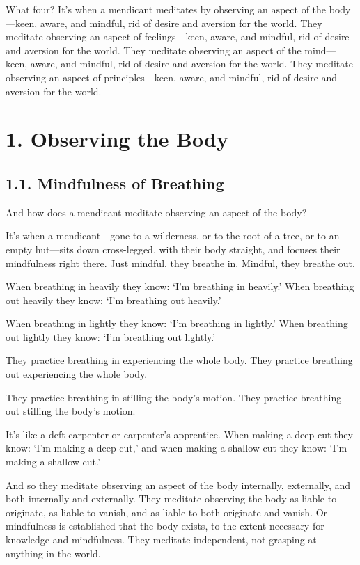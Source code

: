 \documentclass[12pt,openany]{book}%
\begin{document}
What four? It’s when a mendicant meditates by observing an aspect of the body—keen, aware, and mindful, rid of desire and aversion for the world. They meditate observing an aspect of feelings—keen, aware, and mindful, rid of desire and aversion for the world. They meditate observing an aspect of the mind—keen, aware, and mindful, rid of desire and aversion for the world. They meditate observing an aspect of principles—keen, aware, and mindful, rid of desire and aversion for the world. 

\section*{1. Observing the Body }

\subsection*{1.1. Mindfulness of Breathing }

And how does a mendicant meditate observing an aspect of the body? 

It’s when a mendicant—gone to a wilderness, or to the root of a tree, or to an empty hut—sits down cross-legged, with their body straight, and focuses their mindfulness right there. Just mindful, they breathe in. Mindful, they breathe out. 

When breathing in heavily they know: ‘I’m breathing in heavily.’ When breathing out heavily they know: ‘I’m breathing out heavily.’ 

When breathing in lightly they know: ‘I’m breathing in lightly.’ When breathing out lightly they know: ‘I’m breathing out lightly.’ 

They practice breathing in experiencing the whole body. They practice breathing out experiencing the whole body. 

They practice breathing in stilling the body’s motion. They practice breathing out stilling the body’s motion. 

It’s like a deft carpenter or carpenter’s apprentice. When making a deep cut they know: ‘I’m making a deep cut,’ and when making a shallow cut they know: ‘I’m making a shallow cut.’ 

And so they meditate observing an aspect of the body internally, externally, and both internally and externally. They meditate observing the body as liable to originate, as liable to vanish, and as liable to both originate and vanish. Or mindfulness is established that the body exists, to the extent necessary for knowledge and mindfulness. They meditate independent, not grasping at anything in the world. 
\end{document}
